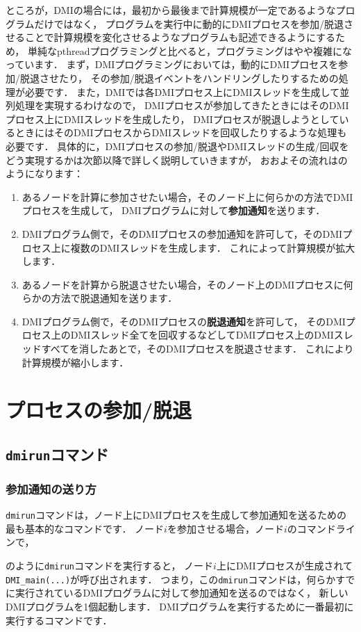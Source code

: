 \documentclass[report,12pt]{jsbook}
\begin{document}
ところが，DMIの場合には，最初から最後まで計算規模が一定であるようなプログラムだけではなく，
プログラムを実行中に動的にDMIプロセスを参加/脱退させることで計算規模を変化させるようなプログラムも記述できるようにするため，
単純なpthreadプログラミングと比べると，プログラミングはやや複雑になっています．
まず，DMIプログラミングにおいては，動的にDMIプロセスを参加/脱退させたり，
その参加/脱退イベントをハンドリングしたりするための処理が必要です．
また，DMIでは各DMIプロセス上にDMIスレッドを生成して並列処理を実現するわけなので，
DMIプロセスが参加してきたときにはそのDMIプロセス上にDMIスレッドを生成したり，
DMIプロセスが脱退しようとしているときにはそのDMIプロセスからDMIスレッドを回収したりするような処理も必要です．
具体的に，DMIプロセスの参加/脱退やDMIスレッドの生成/回収をどう実現するかは次節以降で詳しく説明していきますが，
おおよその流れはのようになります：
\begin{enumerate}
\item あるノードを計算に参加させたい場合，そのノード上に何らかの方法でDMIプロセスを生成して，
  DMIプログラムに対して\textbf{参加通知}を送ります．
\item DMIプログラム側で，そのDMIプロセスの参加通知を許可して，そのDMIプロセス上に複数のDMIスレッドを生成します．
  これによって計算規模が拡大します．
\item あるノードを計算から脱退させたい場合，そのノード上のDMIプロセスに何らかの方法で脱退通知を送ります．
\item DMIプログラム側で，そのDMIプロセスの\textbf{脱退通知}を許可して，
  そのDMIプロセス上のDMIスレッド全てを回収するなどしてDMIプロセス上のDMIスレッドすべてを消したあとで，そのDMIプロセスを脱退させます．
  これにより計算規模が縮小します．
\end{enumerate}

\section{プロセスの参加/脱退}

\subsection{\texttt{dmirun}コマンド}

\subsubsection{参加通知の送り方}

\texttt{dmirun}コマンドは，ノード上にDMIプロセスを生成して参加通知を送るための最も基本的なコマンドです．
ノード$i$を参加させる場合，ノード$i$のコマンドラインで，
のように\texttt{dmirun}コマンドを実行すると，
ノード$i$上にDMIプロセスが生成されて\texttt{DMI\_main(...)}が呼び出されます．
つまり，この\texttt{dmirun}コマンドは，何らかすでに実行されているDMIプログラムに対して参加通知を送るのではなく，
新しいDMIプログラムを1個起動します．
DMIプログラムを実行するために一番最初に実行するコマンドです．
\end{document}
